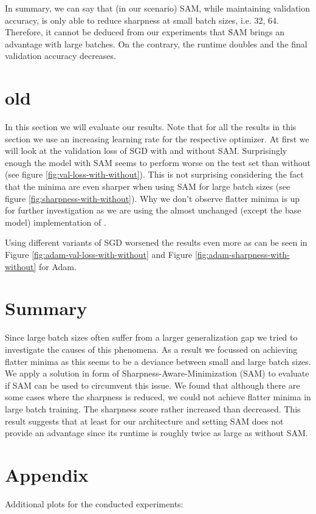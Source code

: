 \documentclass[10pt,conference,compsocconf]{IEEEtran}
\begin{document}
In summary, we can say that (in our scenario) SAM, while maintaining validation accuracy, is only able to reduce sharpness at small batch sizes, i.e. {32, 64}. Therefore, it cannot be deduced from our experiments that SAM brings an advantage with large batches. On the contrary, the runtime doubles and the final validation accuracy decreases.

\section{old}
In this section we will evaluate our results. Note that for all the results in this section we use an increasing learning rate for the respective optimizer. At first we will look at the validation loss of SGD with and without SAM. Surprisingly enough the model with SAM seems to perform worse on the test set than without (see figure \ref{fig:val-loss-with-without}). This is not surprising considering the fact that the minima are even sharper when using SAM for large batch sizes (see figure \ref{fig:sharpness-with-without}). Why we don't observe flatter minima is up for further investigation as we are using the almost unchanged (except the base model) implementation of \cite{paulSharpnessAwareMinimizationTensorFlow2022}.


Using different variants of SGD worsened the results even more as can be seen in Figure \ref{fig:adam-val-loss-with-without} and Figure \ref{fig:adam-sharpness-with-without} for Adam.



\section{Summary}

Since large batch sizes often suffer from a larger generalization gap we tried to investigate the causes of this phenomena. As a result we focussed on achieving flatter minima as this seems to be a deviance between small and large batch sizes. We apply a solution in form of Sharpness-Aware-Minimization (SAM) to evaluate if SAM can be used to circumvent this issue. We found that although there are some cases where the sharpness is reduced, we could not achieve flatter minima in large batch training. The sharpness score rather increased than decreased. This result suggests that at least for our architecture and setting SAM does not provide an advantage since its runtime is roughly twice as large as without SAM.

\section*{Appendix}
\label{sec:appendix}
Additional plots for the conducted experiments:


\newpage


\end{document}
